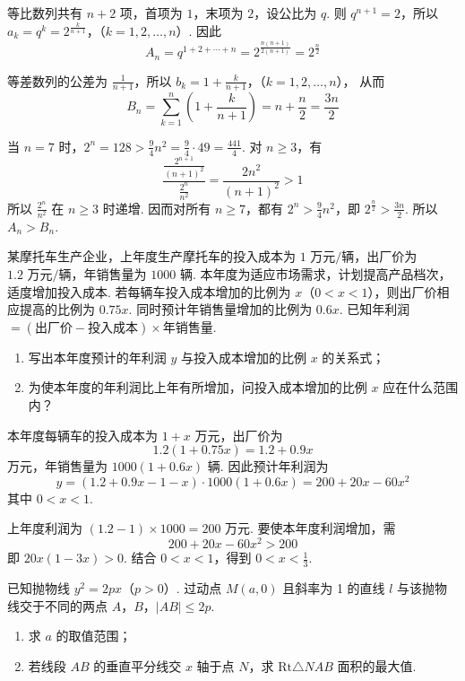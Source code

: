 \begin{solution}
等比数列共有 \(n+2\) 项，首项为 \(1\)，末项为 \(2\)，设公比为 \(q\). 则 \(q^{n+1}=2\)，所以
\(a_k=q^k=2^{\frac{k}{n+1}}\)，（\(k=1,2,\ldots,n\)）.
因此
\[
A_n=q^{1+2+\cdots+n}=2^{\frac{n(n+1)}{2(n+1)}}=2^{\frac{n}{2}}
\]

等差数列的公差为 \(\frac1{n+1}\)，所以
\(b_k=1+\frac{k}{n+1}\)，（\(k=1,2,\ldots,n\)），
从而
\[
B_n=\sum_{k=1}^n\left(1+\frac{k}{n+1}\right)=n+\frac n2=\frac{3n}{2}
\]

当 \(n=7\) 时，\(2^n=128>\frac94n^2=\frac94\cdot49=\frac{441}{4}\). 对 \(n\geqslant3\)，有
\[
\frac{\frac{2^{n+1}}{(n+1)^2}}{\frac{2^n}{n^2}}=\frac{2n^2}{(n+1)^2}>1
\]
所以 \(\frac{2^n}{n^2}\) 在 \(n\geqslant3\) 时递增. 因而对所有 \(n\geqslant7\)，都有 \(2^n>\frac94n^2\)，即 \(2^{\frac{n}{2}}>\frac{3n}{2}\). 所以 \(A_n>B_n\).
\end{solution}

\begin{problem}
某摩托车生产企业，上年度生产摩托车的投入成本为 \(1\text{ 万元/辆}\)，出厂价为 \(1.2\text{ 万元/辆}\)，年销售量为 \(1000\text{ 辆}\). 本年度为适应市场需求，计划提高产品档次，适度增加投入成本. 若每辆车投入成本增加的比例为 \(x\)（\(0 < x < 1\)），则出厂价相应提高的比例为 \(0.75x\). 同时预计年销售量增加的比例为 \(0.6x\). 已知年利润 \(= (\text{出厂价} - \text{投入成本}) \times \text{年销售量}\).
\begin{enumerate}
\item 写出本年度预计的年利润 \(y\) 与投入成本增加的比例 \(x\) 的关系式；
\item 为使本年度的年利润比上年有所增加，问投入成本增加的比例 \(x\) 应在什么范围内？
\end{enumerate}
\end{problem}

\begin{solution}
本年度每辆车的投入成本为 \(1+x\) 万元，出厂价为
\[
1.2(1+0.75x)=1.2+0.9x
\]
万元，年销售量为 \(1000(1+0.6x)\) 辆. 因此预计年利润为
\[
y=(1.2+0.9x-1-x)\cdot1000(1+0.6x)=200+20x-60x^2
\]
其中 \(0<x<1\).

上年度利润为 \((1.2-1)\times1000=200\) 万元. 要使本年度利润增加，需
\[
200+20x-60x^2>200
\]
即 \(20x(1-3x)>0\). 结合 \(0<x<1\)，得到 \(0<x<\frac13\).
\end{solution}

\begin{problem}
已知抛物线 \(y^{2} = 2px\)（\(p > 0\)）. 过动点 \(M(a,0)\) 且斜率为 1 的直线 \(l\) 与该抛物线交于不同的两点 \(A\)，\(B\)，\(|AB| \leqslant 2p\).
\begin{enumerate}
\item 求 \(a\) 的取值范围；
\item 若线段 \(AB\) 的垂直平分线交 \(x\) 轴于点 \(N\)，求 \(\mathrm{Rt}\triangle NAB\) 面积的最大值.
\end{enumerate}
\end{problem}

